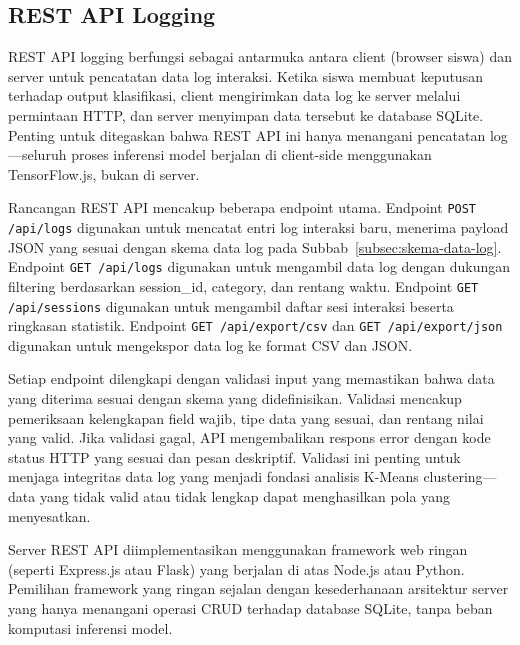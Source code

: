 \documentclass[12pt,oneside]{report}
\begin{document}
\subsection{REST API Logging}
\label{subsec:rest-api}

REST API logging berfungsi sebagai antarmuka antara client (browser siswa) dan server untuk pencatatan data log interaksi. Ketika siswa membuat keputusan terhadap output klasifikasi, client mengirimkan data log ke server melalui permintaan HTTP, dan server menyimpan data tersebut ke database SQLite. Penting untuk ditegaskan bahwa REST API ini hanya menangani pencatatan log—seluruh proses inferensi model berjalan di client-side menggunakan TensorFlow.js, bukan di server.

Rancangan REST API mencakup beberapa endpoint utama. Endpoint \texttt{POST /api/logs} digunakan untuk mencatat entri log interaksi baru, menerima payload JSON yang sesuai dengan skema data log pada Subbab~\ref{subsec:skema-data-log}. Endpoint \texttt{GET /api/logs} digunakan untuk mengambil data log dengan dukungan filtering berdasarkan session\_id, category, dan rentang waktu. Endpoint \texttt{GET /api/sessions} digunakan untuk mengambil daftar sesi interaksi beserta ringkasan statistik. Endpoint \texttt{GET /api/export/csv} dan \texttt{GET /api/export/json} digunakan untuk mengekspor data log ke format CSV dan JSON.

Setiap endpoint dilengkapi dengan validasi input yang memastikan bahwa data yang diterima sesuai dengan skema yang didefinisikan. Validasi mencakup pemeriksaan kelengkapan field wajib, tipe data yang sesuai, dan rentang nilai yang valid. Jika validasi gagal, API mengembalikan respons error dengan kode status HTTP yang sesuai dan pesan deskriptif. Validasi ini penting untuk menjaga integritas data log yang menjadi fondasi analisis K-Means clustering—data yang tidak valid atau tidak lengkap dapat menghasilkan pola yang menyesatkan.

Server REST API diimplementasikan menggunakan framework web ringan (seperti Express.js atau Flask) yang berjalan di atas Node.js atau Python. Pemilihan framework yang ringan sejalan dengan kesederhanaan arsitektur server yang hanya menangani operasi CRUD terhadap database SQLite, tanpa beban komputasi inferensi model.
\end{document}
